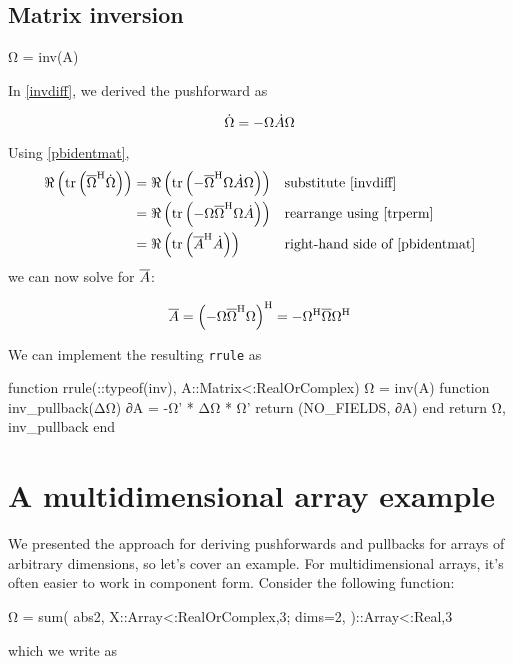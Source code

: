 \documentclass[../main.tex]{subfiles}
\begin{document}
\begin{refsection}
\subsection{Matrix inversion}\label{matrix-inversion-1}
\begin{juliacode}
Ω = inv(A)
\end{juliacode}
In \eqref{invdiff}, we derived the pushforward as

\[\dot{\Omega} = -\Omega \dot{A} \Omega\]

Using \eqref{pbidentmat},
\begin{align*}
\Re\left( \operatorname{tr} \left(
    {\overline{\Omega}}^\mathrm{H} \dot{\Omega}
\right) \right)
    &= \Re\left( \operatorname{tr} \left(
           -{\overline{\Omega}}^\mathrm{H} \Omega \dot{A} \Omega
       \right) \right)
           && \text{substitute } \eqref{invdiff}\\
    &= \Re\left( \operatorname{tr} \left(
           -\Omega {\overline{\Omega}}^\mathrm{H} \Omega \dot{A}
       \right) \right)
           && \text{rearrange using } \eqref{trperm}\\
    &= \Re\left( \operatorname{tr} \left(
           {\overline{A}}^\mathrm{H} \dot{A}
       \right) \right)
           && \text{right-hand side of } \eqref{pbidentmat}
\end{align*}
we can now solve for $\overline{A}$:

\[\overline{A} = {\left( -\Omega {\overline{\Omega}}^\mathrm{H} \Omega \right)}^\mathrm{H}
             = -{\Omega}^\mathrm{H} \overline{\Omega} {\Omega}^\mathrm{H}\]

We can implement the resulting \texttt{rrule} as
\begin{juliacode}
function rrule(::typeof(inv), A::Matrix{<:RealOrComplex})
    Ω = inv(A)
    function inv_pullback(ΔΩ)
        ∂A = -Ω' * ΔΩ * Ω'
        return (NO_FIELDS, ∂A)
    end
    return Ω, inv_pullback
end
\end{juliacode}
\section{A multidimensional array example}\label{a-multidimensional-array-example}

We presented the approach for deriving pushforwards and pullbacks for arrays of arbitrary dimensions, so let's cover an example.
For multidimensional arrays, it's often easier to work in component form.
Consider the following function:
\begin{juliacode}
Ω = sum(
    abs2,
    X::Array{<:RealOrComplex,3};
    dims=2,
)::Array{<:Real,3}
\end{juliacode}
which we write as


\end{refsection}
\end{document}
